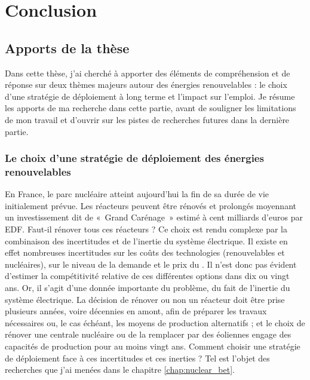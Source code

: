 \chapter{Conclusion} \label{chap:conclusion}

\section{Apports de la thèse} \label{sec:apports}

Dans cette thèse, j’ai cherché à apporter des éléments de compréhension et de réponse sur deux thèmes majeurs autour des énergies renouvelables : le choix d’une stratégie de déploiement à long terme et l'impact sur l’emploi. 
Je résume les apports de ma recherche dans cette partie, avant de souligner les limitations de mon travail et d'ouvrir sur les pistes de recherches futures dans la dernière partie.

\subsection{Le choix d'une stratégie de déploiement des énergies renouvelables}

En France, le parc nucléaire atteint aujourd'hui la fin de sa durée de vie initialement prévue. Les réacteurs peuvent être rénovés et prolongés moyennant un investissement dit de «~Grand Carénage~» estimé à cent milliards d'euros par EDF. Faut-il rénover tous ces réacteurs ? Ce choix est rendu complexe par la combinaison des incertitudes et de l'inertie du système électrique.
Il existe en effet nombreuses incertitudes sur les coûts des technologies (renouvelables et nucléaires), sur le niveau de la demande et le prix du \coo. Il n'est donc pas évident d'estimer la compétitivité relative de ces différentes options dans dix ou vingt ans. Or, il s'agit d'une donnée importante du problème, du fait de l'inertie du système électrique.
La décision de rénover ou non un réacteur doit être prise plusieurs années, voire décennies en amont, afin de préparer les travaux nécessaires ou, le cas échéant, les moyens de production alternatifs ; et le choix de rénover une centrale nucléaire ou de la remplacer par des éoliennes engage des capacités de production pour au moins vingt ans.
Comment choisir une stratégie de déploiement face à ces incertitudes et ces inerties ? Tel est l'objet des recherches que j'ai menées dans le chapitre \ref{chap:nuclear_bet}.

